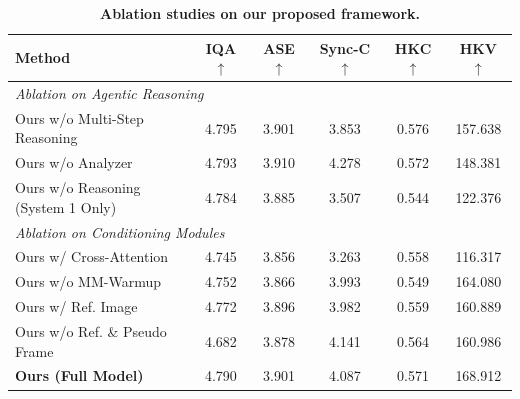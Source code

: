 \begin{table}[t!]
    \centering
    \caption{\textbf{Ablation studies on our proposed framework.} }
    \label{tab:full_ablation}
    \begin{tabular}{l|ccccc} 
        \toprule
        \textbf{Method} & \textbf{IQA} $\uparrow$ & \textbf{ASE} $\uparrow$ & \textbf{Sync-C} $\uparrow$ & \textbf{HKC} $\uparrow$ & \textbf{HKV} $\uparrow$ \\
        \midrule
        \multicolumn{6}{l}{\textit{Ablation on Agentic Reasoning}} \\
        \midrule
        Ours w/o Multi-Step Reasoning & 4.795 & 3.901 & 3.853 & 0.576 & 157.638 \\
        Ours w/o Analyzer             & 4.793 & 3.910 & 4.278 & 0.572 & 148.381 \\
        Ours w/o Reasoning (System 1 Only) & 4.784 & 3.885 & 3.507 & 0.544 & 122.376 \\
        \midrule
        \multicolumn{6}{l}{\textit{Ablation on Conditioning Modules}} \\
        \midrule
        Ours w/ Cross-Attention       & 4.745 & 3.856 & 3.263 & 0.558 & 116.317 \\
        Ours w/o MM-Warmup            & 4.752 & 3.866 & 3.993 & 0.549 & 164.080 \\
        Ours w/ Ref. Image            & 4.772 & 3.896 & 3.982 & 0.559 & 160.889 \\
        Ours w/o Ref. \& Pseudo Frame  & 4.682 & 3.878 & 4.141 & 0.564 & 160.986 \\
        \midrule
        \textbf{Ours (Full Model)}    & 4.790 & 3.901 & 4.087 & 0.571 & 168.912 \\
        \bottomrule 
    \end{tabular}
\end{table}
  
\par

